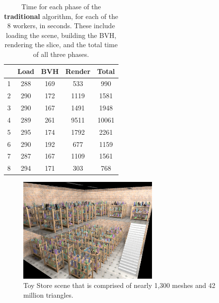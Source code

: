 \documentclass[a4paper,twoside]{article}
\begin{document}
\begin{table}
\begin{center}
\begin{tabular}{|l||c|c|c||c|}
    \hline
    & Load & BVH & Render & \textbf{Total}\\
    \hline
    \hline
    1 & 288 & 169 & 533 & 990 \\
    \hline
    2 & 290 & 172 & 1119 & 1581 \\
    \hline
    3 & 290 & 167 & 1491 & 1948 \\
    \hline
    4 & 289 & 261 & 9511 & 10061 \\
    \hline
    5 & 295 & 174 & 1792 & 2261 \\
    \hline
    6 & 290 & 192 & 677 & 1159 \\
    \hline
    7 & 287 & 167 & 1109 & 1561 \\
    \hline
    8 & 294 & 171 & 303 & 768 \\
    \hline
\end{tabular}
\caption{Time for each phase of the \textbf{traditional} algorithm, for each of the 8 workers, in seconds. These include loading the scene, building the BVH, rendering the slice, and the total time of all three phases.}
\label{tb:traditionaltimes}
\end{center}
\end{table}

\begin{figure}[h!]
    \centering
    \includegraphics[width=70mm]{showoff/toystore.png}
    \caption{Toy Store scene that is comprised of nearly 1,300 meshes and 42 million triangles.}
    \label{fig:sotoystore}
\end{figure}
\end{document}
